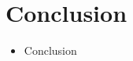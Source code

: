 \documentclass[11pt]{article}       %
\newenvironment{slide}[1]        {\section{#1} \begin{itemize}}%
                                 {\end{itemize}}
\begin{document}
\begin{slide}{Conclusion}
\item Conclusion
\end{slide}





\end{document}
